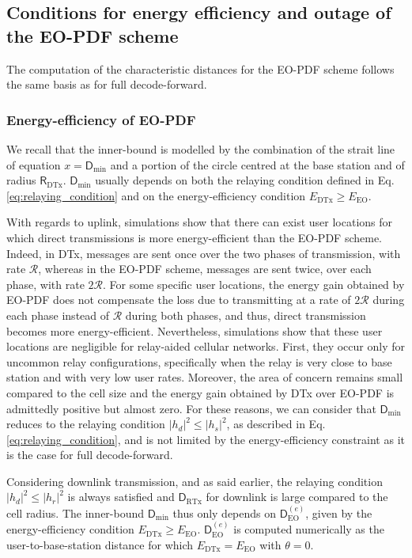 \documentclass[journal]{IEEEtran}
\theoremstyle{definition}
\begin{document}
\subsection{Conditions for energy efficiency and outage of the EO-PDF scheme}

The computation of the characteristic distances for the EO-PDF scheme follows the same basis as for full decode-forward.

\subsubsection{Energy-efficiency of EO-PDF}

We recall that the inner-bound is modelled by the combination of the strait line of equation $x=\mathsf{D}_{\min}$ and a portion of the circle centred at the base station and of radius $\mathsf{R}_{\text{DTx}}$. $\mathsf{D}_{\min}$ usually depends on both the relaying condition defined in Eq. \eqref{eq:relaying_condition} and on the energy-efficiency condition $E_{\text{DTx}} \geq E_{\text{EO}}$.

With regards to uplink, simulations show that there can exist user locations for which direct transmissions is more energy-efficient than the EO-PDF scheme. Indeed, in DTx, messages are sent once over the two phases of transmission, with rate $\mathcal{R}$, whereas in the EO-PDF scheme, messages are sent twice, over each phase, with rate $2\mathcal{R}$. For some specific user locations, the energy gain obtained by EO-PDF does not compensate the loss due to transmitting at a rate of $2 \mathcal{R}$ during each phase instead of $\mathcal{R}$ during both phases, and thus, direct transmission becomes more energy-efficient.
Nevertheless, simulations show that these user locations are negligible for relay-aided cellular networks. First, they occur only for uncommon relay configurations, specifically when the relay is very close to base station and with very low user rates. Moreover, the area of concern remains small compared to the cell size and the energy gain obtained by DTx over EO-PDF is admittedly positive but almost zero. For these reasons, we can consider that $\mathsf{D}_{\min}$ reduces to the relaying condition $\vert h_d \vert ^2 \leq \vert h_s \vert^2$, as described in Eq. \eqref{eq:relaying_condition}, and is not limited by the energy-efficiency constraint as it is the case for full decode-forward.

Considering downlink transmission, and as said earlier, the relaying condition $\vert h_d \vert^2 \leq \vert h_r \vert^2$ is always satisfied and $\mathsf{D}_{\text{RTx}}$ for downlink is large compared to the cell radius. The inner-bound $\mathsf{D}_{\min}$ thus only depends on $\mathsf{D}_{\text{EO}}^{(e)}$, given by the energy-efficiency condition $E_{\text{DTx}} \geq E_{\text{EO}}$.  $\mathsf{D}_{\text{EO}}^{(e)}$ is computed numerically as the user-to-base-station distance for which $E_{\text{DTx}} = E_{\text{EO}}$ with $\theta=0$.
\end{document}
